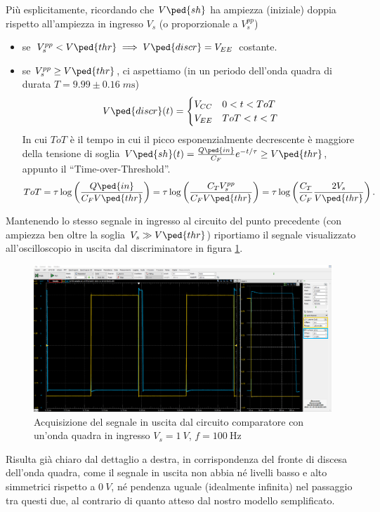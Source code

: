\documentclass[10pt,a4paper]{article}
\begin{document}
Più esplicitamente, ricordando che $V\ped{sh}$ ha ampiezza (iniziale) doppia
rispetto all'ampiezza in ingresso $V_s$ (o proporzionale a $V_s^{pp}$)
\begin{itemize}
\item se $V_s^{pp} < V\ped{thr} \implies V\ped{discr} = V_{EE}$ costante.
\item se $V_s^{pp} \geq V\ped{thr}$, ci aspettiamo (in un periodo dell'onda
quadra di durata $T = 9.99 \pm 0.16 \; \si{m\s}$)
\[
V\ped{discr}(t) =
\begin{cases}
V_{CC} & 0 < t < ToT \\
V_{EE} & ToT < t < T
\end{cases}
\]
In cui $ToT$ è il tempo in cui il picco esponenzialmente decrescente è
maggiore della tensione di soglia
$V\ped{sh}(t) = \frac{Q\ped{in}}{C_F} e^{-t/\tau} \geq V\ped{thr}$, appunto il
``Time-over-Threshold''.
\begin{equation} \label{eq:ToT}
ToT = \tau \log\left(\frac{Q\ped{in}}{C_F V\ped{thr}}\right) =
\tau \log\left(\frac{C_T V_s^{pp}}{C_F V\ped{thr}}\right) = 
\tau \log\left(\frac{C_T}{C_F} \frac{2 V_s}{V\ped{thr}}\right).
  \end{equation}
\end{itemize}

Mantenendo lo stesso segnale in ingresso al circuito del punto precedente
(con ampiezza ben oltre la soglia $V_s \gg V\ped{thr}$) riportiamo il
segnale visualizzato all'oscilloscopio in uscita dal discriminatore in figura
\ref{fig: discr}.
\begin{figure}[htbp]
\centering
\includegraphics[scale=0.335]{discrzoom}
\caption{Acquisizione del segnale in uscita dal circuito comparatore con
un'onda quadra in ingresso $V_s = \SI{1}{V}$, $f = \SI{100}{\Hz}$
\label{fig: discr}}
\end{figure}

Risulta già chiaro dal dettaglio a destra, in corrispondenza del fronte di
discesa dell'onda quadra, come il segnale in uscita non abbia né livelli basso
e alto simmetrici rispetto a $\SI{0}{V}$, né pendenza uguale (idealmente
infinita) nel passaggio tra questi due, al contrario di quanto atteso dal
nostro modello semplificato.
\end{document}

